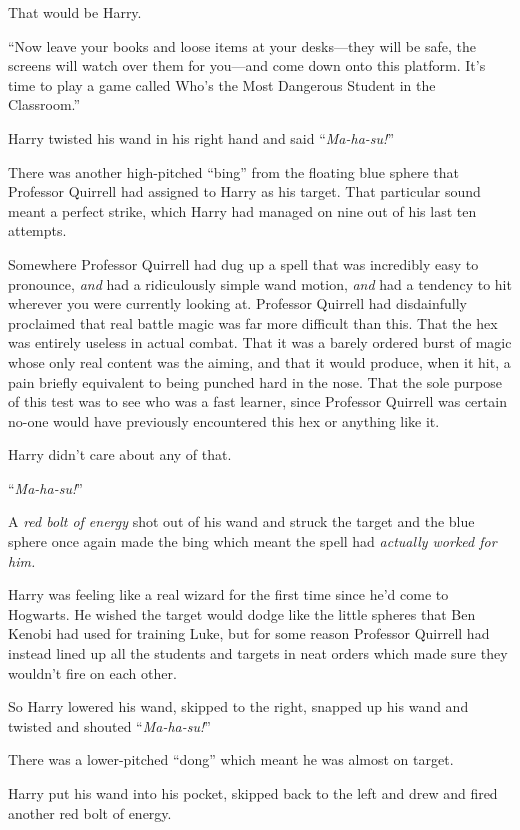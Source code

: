 That would be Harry.

“Now leave your books and loose items at your desks—they will be safe, the screens will watch over them for you—and come down onto this platform. It’s time to play a game called Who’s the Most Dangerous Student in the Classroom.”

\later

Harry twisted his wand in his right hand and said “\emph{Ma-ha-su!}”

There was another high-pitched “bing” from the floating blue sphere that Professor Quirrell had assigned to Harry as his target. That particular sound meant a perfect strike, which Harry had managed on nine out of his last ten attempts.

Somewhere Professor Quirrell had dug up a spell that was incredibly easy to pronounce, \emph{and} had a ridiculously simple wand motion, \emph{and} had a tendency to hit wherever you were currently looking at. Professor Quirrell had disdainfully proclaimed that real battle magic was far more difficult than this. That the hex was entirely useless in actual combat. That it was a barely ordered burst of magic whose only real content was the aiming, and that it would produce, when it hit, a pain briefly equivalent to being punched hard in the nose. That the sole purpose of this test was to see who was a fast learner, since Professor Quirrell was certain no-one would have previously encountered this hex or anything like it.

Harry didn’t care about any of that.

“\emph{Ma-ha-su!}”

A \emph{red bolt of energy} shot out of his wand and struck the target and the blue sphere once again made the bing which meant the spell had \emph{actually worked for him.}

Harry was feeling like a real wizard for the first time since he’d come to Hogwarts. He wished the target would dodge like the little spheres that Ben Kenobi had used for training Luke, but for some reason Professor Quirrell had instead lined up all the students and targets in neat orders which made sure they wouldn’t fire on each other.

So Harry lowered his wand, skipped to the right, snapped up his wand and twisted and shouted “\emph{Ma-ha-su!}”

There was a lower-pitched “dong” which meant he was almost on target.

Harry put his wand into his pocket, skipped back to the left and drew and fired another red bolt of energy.

